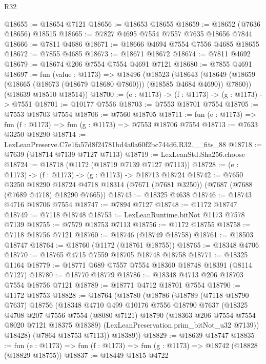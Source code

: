 \begin{lexlean}{R32}
\begin{coremodule}
@18655 := @18654 @7121
@18656 := @18653 @18655
@18659 := @18652 (@7636 @18656) @18515
@18665 := @7827 @4695 @7554 @7557 @7635 @18656 @7844
@18666 := @7811 @4686
@18671 := @18666 @4694 @7554 @7556 @4685 @18655
@18672 := @7855 @4685
@18673 := @18671 @18672
@18674 := @7811 @4692
@18679 := @18674 @206 @7554 @7554 @4691 @7121
@18680 := @7855 @4691
@18697 := fun (value : @1173) =>
  @18496
    (@18523
      (@18643 (@18649 (@18659 (@18665 (@18673 (@18679 @18680 @7860))) (@18585 @4684 @4690)) @7860))
      (@18639 @18510 @18514))
@18700 := (e : @1173) -> (f : @1173) -> (g : @1173) -> @7551
@18701 := @10177 @7556
@18703 := @7553 @18701 @7554
@18705 := @7553 @18703 @7554
@18706 := @7560 @18705
@18711 := fun (e : @1173) => fun (f : @1173) => fun (g : @1173) => @7553 @18706 @7554
@18713 := @7633 @3250 @18290
@18714 := LexLeanPreserve.C7e1fa57d8f24781bd4a0a60f2bc744d6.R32.__fits_88
@18718 := @7639 (@18714 @7139 @7127 @7113)
@18719 := LexLeanStd.Sha256.choose
@18724 := @18718 (@1172 (@18719 @7139 @7127 @7113))
@18728 := (e : @1173) -> (f : @1173) -> (g : @1173) -> @18713 @18724
@18742 := @7650
    @3250
    @18290
    @18724
    @4718
    @18314
    (@7671 (@7681 @3250))
    (@7687 (@7688 (@7689 @4718) @18290 @7665))
@18743 := @18325 @4638
@18746 := @18743 @4716 @18706 @7554
@18747 := @7894 @7127
@18748 := @1172 @18747
@18749 := @7118 @18748
@18753 := LexLeanRuntime.bitNot @1173 @7578 @7139
@18755 := @7579 @18753 @7113
@18756 := @1172 @18755
@18758 := @7118 @18756 @7121
@18760 := @18746 (@18749 @18758)
@18761 := @18503 @18747
@18764 := @18760 (@1172 (@18761 @18755))
@18765 := @18348 @4706
@18770 := @18765 @4715 @7559 @18705 @18748 @18758
@18771 := @18325 @1164
@18779 := @18771 @689 @7557 @7554 @18360 @18748 @18391 (@8114 @7127)
@18780 := @18770 @18779
@18786 := @18348 @4713 @206 @18703 @7554 @18756 @7121
@18789 := @18771 @4712 @18701 @7554
@18790 := @1172 @18753
@18828 := @18764
    (@18780
      (@18786
        (@18789
          (@7118 @18790 @7637)
          @18756
          (@18348
            @4710
            @499
            @10176
            @7556
            @18790
            @7637
            (@18325
              @4708
              @207
              @7556
              @7554
              (@8080 @7121)
              @18790
              (@18363 @206 @7554 @7554 @8020 @7121 @18375 @18389)
              (LexLeanPreservation.prim_bitNot_u32 @7139))
            @18428)
          (@7864 @18753 @7113))
        @18389))
@18829 := @18639 @18747
@18835 := fun (e : @1173) => fun (f : @1173) => fun (g : @1173) => @18742 (@18828 (@18829 @18755))
@18837 := @18449 @1815 @4722

\end{coremodule}
\end{lexlean}
